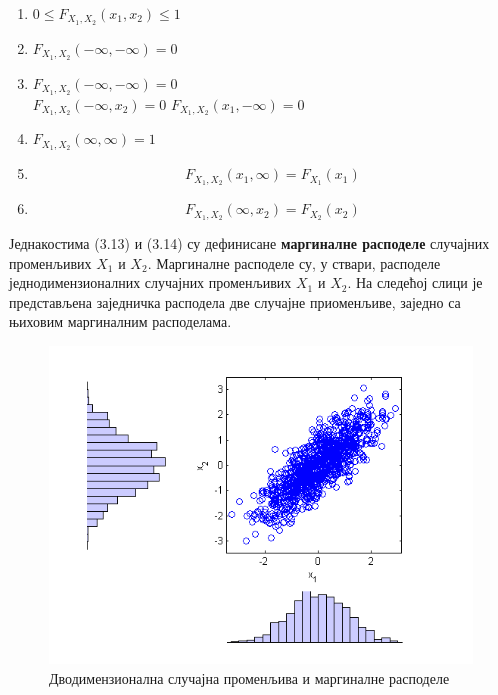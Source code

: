 \begin{enumerate}

\item  $ 0 \leq F_{X_1,X_2}(x_1,x_2) \leq 1 $
\item  $ F_{X_1,X_2}(-\infty,-\infty) =0 $
\item  $ F_{X_1,X_2}(-\infty,-\infty) =0 $  \\
$ F_{X_1,X_2}(-\infty,x_2) =0 $
$ F_{X_1,X_2}(x_1,-\infty) =0 $
\item  $ F_{X_1,X_2}(\infty,\infty) =1 $
\item  \begin{equation}
F_{X_1,X_2}(x_1,\infty) = F_{X_1}(x_1) 
\end{equation} 
\item 
\begin{equation}
F_{X_1,X_2}(\infty,x_2) = F_{X_2}(x_2) 
\end{equation} 

\end{enumerate}


Једнакостима (3.13) и (3.14) су дефинисане \textbf{маргиналне расподеле} случајних променљивих $X_1$ и $X_2$. Маргиналне расподеле су, у ствари, расподеле једнодимензионалних случајних променљивих $X_1$ и $X_2$. На следећој слици је представљена заједничка расподела две случајне приоменљиве, заједно са њиховим маргиналним расподелама.

\begin{figure}[H]
    \centering
\captionsetup{justification=centering}
   \includegraphics[scale=0.8]{./Slike/slika19.png} 
	\caption{Дводимензионална случајна променљива и маргиналне расподеле} 
	\label{fig:slika13}
\end{figure}


